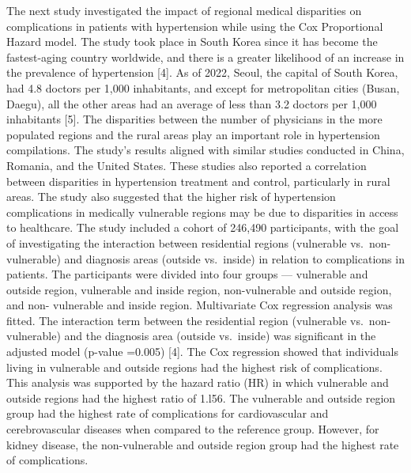 \documentclass[
  letterpaper,
  DIV=11,
  numbers=noendperiod]{scrreprt}
\begin{document}
The next study investigated the impact of regional medical disparities
on complications in patients with hypertension while using the Cox
Proportional Hazard model. The study took place in South Korea since it
has become the fastest-aging country worldwide, and there is a greater
likelihood of an increase in the prevalence of hypertension {[}4{]}. As
of 2022, Seoul, the capital of South Korea, had 4.8 doctors per 1,000
inhabitants, and except for metropolitan cities (Busan, Daegu), all the
other areas had an average of less than 3.2 doctors per 1,000
inhabitants {[}5{]}. The disparities between the number of physicians in
the more populated regions and the rural areas play an important role in
hypertension compilations. The study's results aligned with similar
studies conducted in China, Romania, and the United States. These
studies also reported a correlation between disparities in hypertension
treatment and control, particularly in rural areas. The study also
suggested that the higher risk of hypertension complications in
medically vulnerable regions may be due to disparities in access to
healthcare. The study included a cohort of 246,490 participants, with
the goal of investigating the interaction between residential regions
(vulnerable vs.~non-vulnerable) and diagnosis areas (outside vs.~inside)
in relation to complications in patients. The participants were divided
into four groups --- vulnerable and outside region, vulnerable and
inside region, non-vulnerable and outside region, and non- vulnerable
and inside region. Multivariate Cox regression analysis was fitted. The
interaction term between the residential region (vulnerable
vs.~non-vulnerable) and the diagnosis area (outside vs.~inside) was
significant in the adjusted model (p-value =0.005) {[}4{]}. The Cox
regression showed that individuals living in vulnerable and outside
regions had the highest risk of complications. This analysis was
supported by the hazard ratio (HR) in which vulnerable and outside
regions had the highest ratio of 1.l56. The vulnerable and outside
region group had the highest rate of complications for cardiovascular
and cerebrovascular diseases when compared to the reference group.
However, for kidney disease, the non-vulnerable and outside region group
had the highest rate of complications.
\end{document}
